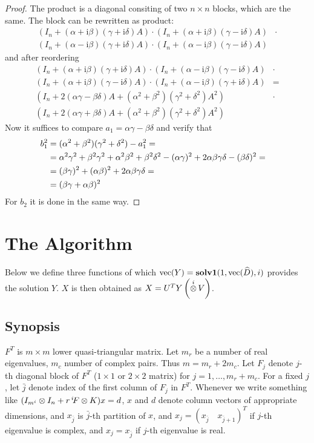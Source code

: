 \documentclass[11pt,a4paper]{article}
\begin{document}
\begin{proof}
The product is a diagonal consiting of two $n\times n$ blocks, which are the
same. The block can be rewritten as product:
\begin{align*}
(I_n+(\alpha+\mathrm i\beta)(\gamma+\mathrm i\delta)A)\cdot
(I_n+(\alpha+\mathrm i\beta)(\gamma-\mathrm i\delta)A)&\cdot\\
(I_n+(\alpha-\mathrm i\beta)(\gamma+\mathrm i\delta)A)\cdot
(I_n+(\alpha-\mathrm i\beta)(\gamma-\mathrm i\delta)A)&
\end{align*}
and after reordering
\begin{align*}
(I_n+(\alpha+\mathrm i\beta)(\gamma+\mathrm i\delta)A)\cdot
(I_n+(\alpha-\mathrm i\beta)(\gamma-\mathrm i\delta)A)&\cdot\\
(I_n+(\alpha+\mathrm i\beta)(\gamma-\mathrm i\delta)A)\cdot
(I_n+(\alpha-\mathrm i\beta)(\gamma+\mathrm i\delta)A)&=\\
(I_n+2(\alpha\gamma-\beta\delta)A+
(\alpha^2+\beta^2)(\gamma^2+\delta^2)A^2)&\cdot\\
(I_n+2(\alpha\gamma+\beta\delta)A+
(\alpha^2+\beta^2)(\gamma^2+\delta^2)A^2)&
\end{align*}
Now it suffices to compare $a_1=\alpha\gamma-\beta\delta$ and verify
that 
\begin{align*}
b_1^2 & = (\alpha^2+\beta^2)(\gamma^2+\delta^2)-a_1^2 =\cr
      & = \alpha^2\gamma^2+\beta^2\gamma^2+\alpha^2\beta^2+\beta^2\delta^2-
          (\alpha\gamma)^2+2\alpha\beta\gamma\delta-(\beta\delta)^2=\cr
      & = (\beta\gamma)^2 + (\alpha\beta)^2 + 2\alpha\beta\gamma\delta=\cr
      & = (\beta\gamma +\alpha\beta)^2
\end{align*}
For $b_2$ it is done in the same way.
\end{proof}

\section{The Algorithm}

Below we define three functions of which
$\mathop{\hbox{vec}}(Y)=\mathbf{solv1}(1,\mathop{\hbox{vec}}(\widehat{D}),i)$ provides the solution $Y$. $X$
is then obtained as $X=U^TY\left(\mathop{\overset{i}{\otimes}} V\right)$.

\subsection{Synopsis}

$F^T$ is $m\times m$ lower quasi-triangular matrix. Let $m_r$ be a
number of real eigenvalues, $m_c$ number of complex pairs. Thus
$m=m_r+2m_c$. Let $F_j$ denote
$j$-th diagonal block of $F^T$ ($1\times 1$ or $2\times 2$ matrix) for
$j=1,\ldots, m_r+m_c$. For a fixed $j$, let $\bar j$ denote index of the
first column of $F_j$ in $F^T$. Whenever we write something like
$(I_{m^i}\otimes I_n+r\,^i\!F\otimes K)x = d$, $x$ and $d$ denote column
vectors of appropriate dimensions, and $x_{\bar j}$ is $\bar j$-th
partition of $x$, and $x_j=(x_{\bar j}\quad x_{\bar j+1})^T$ if $j$-th
eigenvalue is complex, and $x_j=x_{\bar j}$ if $j$-th eigenvalue is real.
\end{document}
